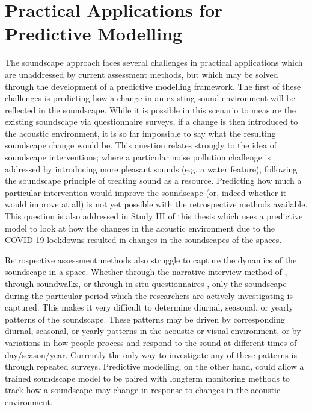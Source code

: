 \section{Practical Applications for Predictive Modelling}

The soundscape approach faces several challenges in practical applications which are unaddressed by current assessment methods, but which may be solved through the development of a predictive modelling framework. The first of these challenges is predicting how a change in an existing sound environment will be reflected in the soundscape. While it is possible in this scenario to measure the existing soundscape via questionnaire surveys, if a change is then introduced to the acoustic environment, it is so far impossible to say what the resulting soundscape change would be. This question relates strongly to the idea of soundscape interventions; where a particular noise pollution challenge is addressed by introducing more pleasant sounds (e.g. a water feature), following the soundscape principle of treating sound as a resource. Predicting how much a particular intervention would improve the soundscape (or, indeed whether it would improve at all) is not yet possible with the retrospective methods available. This question is also addressed in Study III of this thesis  which uses a predictive model to look at how the changes in the acoustic environment due to the COVID-19 lockdowns resulted in changes in the soundscapes of the spaces.

Retrospective assessment methods also struggle to capture the dynamics of the soundscape in a space. Whether through the narrative interview method of , through soundwalks, or through in-situ questionnaires \citep{Mitchell2020Soundscape}, only the soundscape during the particular period which the researchers are actively investigating is captured. This makes it very difficult to determine diurnal, seasonal, or yearly patterns of the soundscape. These patterns may be driven by corresponding diurnal, seasonal, or yearly patterns in the acoustic or visual environment, or by variations in how people process and respond to the sound at different times of day/season/year. Currently the only way to investigate any of these patterns is through repeated surveys. Predictive modelling, on the other hand, could allow a trained soundscape model to be paired with longterm monitoring methods to track how a soundscape may change in response to changes in the acoustic environment. 

